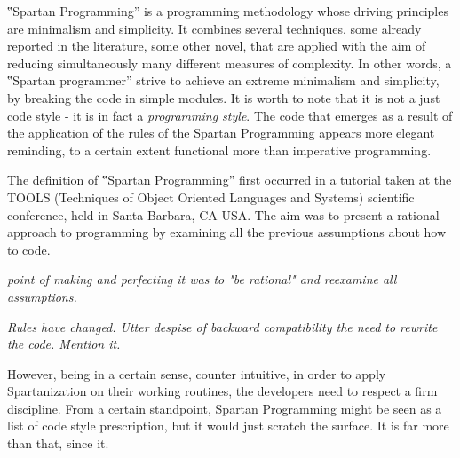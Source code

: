 
‟Spartan Programming” is a programming methodology whose driving principles are
minimalism and simplicity. It combines several techniques,
some already reported in the literature, some other novel, that are applied
with the aim of reducing
simultaneously many different measures of complexity.
In other words, a ‟Spartan programmer” strive
to achieve an extreme minimalism and simplicity, by breaking
the code in simple modules.
It is worth to note that it is not a just code style - it is in fact a \emph{programming style}.
The code that emerges as a result of the application of the rules of the
Spartan Programming appears more elegant reminding, to a certain extent
functional more than imperative programming.


The definition of ‟Spartan Programming” first occurred in a tutorial taken at
the TOOLS (Techniques of Object Oriented Languages and Systems) scientific conference,
held in Santa Barbara, CA USA. %
The aim was to present a rational approach to programming by examining all the previous
assumptions about how to code.

\emph{point of making and perfecting it was to "be rational" and
reexamine all assumptions.}

\emph{Rules have changed.
Utter despise of backward compatibility the need to rewrite the code.
Mention it.}


However, being in a certain sense, counter intuitive, in order to apply
Spartanization on their working routines, the developers need to respect a
firm discipline. From a certain standpoint, Spartan Programming might be
seen as a list of code style prescription, but it would just scratch the
surface. It is far more than that, since it.

